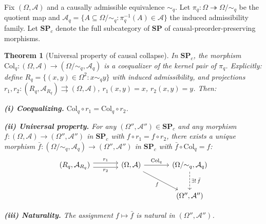 \documentclass[12pt,a4paper]{article}
\newtheorem{theorem}{Theorem}[section]
\theoremstyle{definition}
\theoremstyle{remark}
\newcommand{\SP}{\mathbf{SP}}
\newcommand{\Col}{\ensuremath{\mathrm{Col}}}
\begin{document}
Fix $(\Omega,\mathcal{A})$ and a causally admissible equivalence $\sim_q$. Let
$\pi_q:\Omega\twoheadrightarrow\Omega/{\sim_q}$ be the quotient map and
$\mathcal{A}_q=\{A\subseteq\Omega/{\sim_q}:\pi_q^{-1}(A)\in\mathcal{A}\}$ the
induced admissibility family. Let $\SP_c$ denote the full subcategory of $\SP$
of causal-preorder-preserving morphisms.

\begin{theorem}[Universal property of causal collapse]
\label{thm:collapse-universal}
In $\SP_c$, the morphism $\Col_q:(\Omega,\mathcal{A})\to(\Omega/{\sim_q},\mathcal{A}_q)$
is a coequalizer of the kernel pair of $\pi_q$. Explicitly: define
$R_q=\{(x,y)\in\Omega^2:x\sim_q y\}$ with induced admissibility, and projections
$r_1,r_2:(R_q,\mathcal{A}_{R_q})\rightrightarrows(\Omega,\mathcal{A})$,
$r_1(x,y)=x$, $r_2(x,y)=y$. Then:

\medskip
\noindent\textbf{(i) Coequalizing.}
$\Col_q\circ r_1=\Col_q\circ r_2$.

\medskip
\noindent\textbf{(ii) Universal property.}
For any $(\Omega'',\mathcal{A}'')\in\SP_c$ and any morphism
$f:(\Omega,\mathcal{A})\to(\Omega'',\mathcal{A}'')$ in $\SP_c$ with
$f\circ r_1=f\circ r_2$, there exists a unique morphism
$\bar{f}:(\Omega/{\sim_q},\mathcal{A}_q)\to(\Omega'',\mathcal{A}'')$ in $\SP_c$
with $\bar{f}\circ\Col_q=f$:
\[
\begin{tikzcd}[column sep=3.5em, row sep=2.5em]
  (R_q,\mathcal{A}_{R_q})
    \arrow[r, shift left=0.3em, "r_1"]
    \arrow[r, shift right=0.3em, "r_2"']
  &
  (\Omega,\mathcal{A})
    \arrow[r, "\Col_q"]
    \arrow[dr, "f"']
  &
  (\Omega/{\sim_q},\mathcal{A}_q)
    \arrow[d, dashed, "\exists!\,\bar{f}"]
  \\
  & &
  (\Omega'',\mathcal{A}'')
\end{tikzcd}
\]

\medskip
\noindent\textbf{(iii) Naturality.}
The assignment $f\mapsto\bar{f}$ is natural in $(\Omega'',\mathcal{A}'')$.
\end{theorem}
\end{document}
